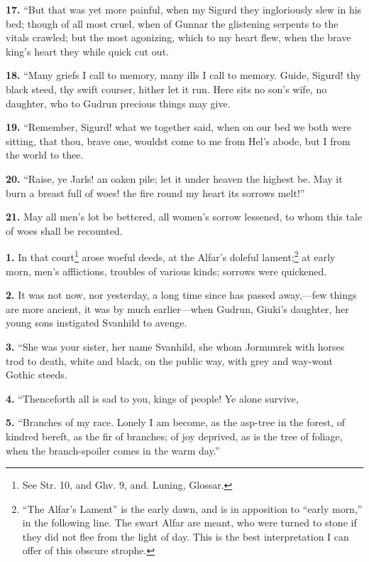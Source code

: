 \textbf{17.} ``But that was yet more painful, when my Sigurd they ingloriously
slew in his bed; though of all most cruel, when of Gunnar the
glistening serpents to the vitals crawled; but the most agonizing,
which to my heart flew, when the brave king's heart they while quick
cut out.

\textbf{18.} ``Many griefs I call to memory, many ills I call to memory.
Guide, Sigurd! thy black steed, thy swift courser, hither let it run.
Here sits no son's wife, no daughter, who to Gudrun precious things
may give.

\textbf{19.} ``Remember, Sigurd! what we together said, when on our bed we
both were sitting, that thou, brave one, wouldst come to me from Hel's
abode, but I from the world to thee.

\textbf{20.} ``Raise, ye Jarls! an oaken pile; let it under heaven the highest
be. May it burn a breast full of woes! the fire round my heart its
sorrows melt!''

\textbf{21.} May all men's lot be bettered, all women's sorrow lessened, to
whom this tale of woes shall be recounted.


\textbf{1.} In that court\footnote{See Str. 10, and Ghv. 9, and. Luning, Glossar.} arose woeful deeds, at the Alfar's doleful
lament;\footnote{``The Alfar's Lament'' is the early dawn, and is in
apposition to ``early morn,'' in the following line. The swart Alfar are
meant, who were turned to stone if they did not flee from the light of
day. This is the best interpretation I can offer of this obscure
strophe.} at early morn, men's afflictions, troubles of various
kinds; sorrows were quickened.

\textbf{2.} It was not now, nor yesterday, a long time since has passed
away,—few things are more ancient, it was by much earlier—when
Gudrun, Giuki's daughter, her young sons instigated Svanhild to
avenge.

\textbf{3.} ``She was your sister, her name Svanhild, she whom Jormunrek with
horses trod to death, white and black, on the public way, with grey
and way-wont Gothic steeds.

\textbf{4.} ``Thenceforth all is sad to you, kings of people! Ye alone
survive,

\textbf{5.} ``Branches of my race. Lonely I am become, as the asp-tree in the
forest, of kindred bereft, as the fir of branches; of joy deprived, as
is the tree of foliage, when the branch-spoiler comes in the warm
day.''

